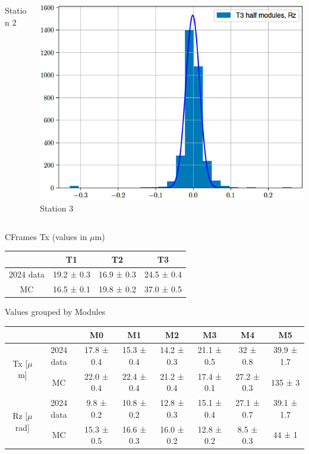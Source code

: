 \documentclass[aspectratio=1610, 12pt, xcolor=dvipsnames]{beamer}
\begin{document}
\begin{frame}
\begin{columns}
\begin{column}[c]{0.33\textwidth}
      Station 2
    \end{column}
    \begin{column}[c]{0.33\textwidth}
      \includegraphics[width=\textwidth]{plots/2025_plots_precision/T3_Rz.png}
      Station 3
    \end{column}
  \end{columns}
\end{frame}

\begin{frame}
  CFrames Tx (values in $\mu$m)
  \begin{table}
    \begin{tabular}{c | c c c}
      \toprule
         & T1 & T2 & T3 \\
      \midrule
        2024 data & 19.2 ± 0.3 & 16.9 ± 0.3 & 24.5 ± 0.4 \\
        MC        & 16.5 ± 0.1 & 19.8 ± 0.2 & 37.0 ± 0.5 \\
      \bottomrule
    \end{tabular}
  \end{table}
  Values grouped by Modules
  \begin{table}
    \begin{tabular}{c | c | c c c c c c}
      \toprule
        & & M0 & M1 & M2 & M3 & M4 & M5 \\
      \midrule
      \multirow{2}{3em}{Tx [$\mu$m]} & 2024 data & 17.8 ± 0.4 & 15.3 ± 0.4 & 14.2 ± 0.3 & 21.1 ± 0.5 & 32 ± 0.8 & 39.9 ± 1.7 \\
                            & MC & 22.0 ± 0.4 & 22.4 ± 0.4 & 21.2 ± 0.4 & 17.4 ± 0.1 & 27.2 ± 0.3 & 135 ± 3 \\
      \hline
      \multirow{2}{3em}{Rz [$\mu$rad]} & 2024 data & 9.8 ± 0.2 & 10.8 ± 0.2 & 12.8 ± 0.3 & 15.1 ± 0.4 & 27.1 ± 0.7 & 39.1 ± 1.7 \\
                            & MC & 15.3 ± 0.5 & 16.6 ± 0.3 & 16.0 ± 0.2 & 12.8 ± 0.2 & 8.5 ± 0.3 & 44 ± 1 \\
      \bottomrule
    \end{tabular}
  \end{table}
\end{frame}
\end{document}
